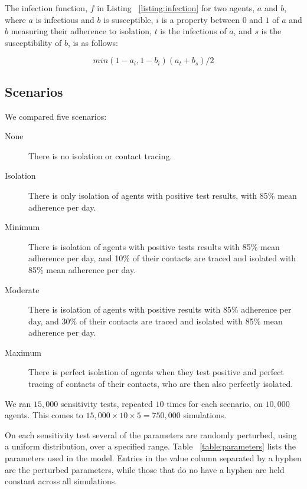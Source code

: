 \documentclass{article}
\begin{document}
The infection function, $f$ in Listing ~\ref{listing:infection} for two agents,
$a$ and $b$, where $a$ is infectious and $b$ is susceptible, $i$ is a property
between $0$ and $1$ of $a$ and $b$ measuring their adherence to isolation, $t$
is the infectious of $a$, and $s$ is the susceptibility of $b$, is
as follows:

\begin{equation}
min(1-a_i,1-b_i) (a_t+b_s)/2
\end{equation}

\subsection{Scenarios}

We compared five scenarios:

\begin{description}

\item[None] There is no isolation or contact tracing.

\item[Isolation] There is only isolation of agents with positive test results,
  with 85\% mean adherence per day.

\item[Minimum] There is isolation of agents with positive tests results with
  85\% mean adherence per day, and 10\% of their contacts are traced and
  isolated with 85\% mean adherence per day.

\item[Moderate] There is isolation of agents with positive results with 85\%
  adherence per day, and 30\% of their contacts are traced and isolated with
  85\% mean adherence per day.

\item[Maximum] There is perfect isolation of agents when they test positive and
  perfect tracing of contacts of their contacts, who are then also perfectly
  isolated.

\end{description}

We ran $15,000$ sensitivity tests, repeated $10$ times for each scenario, on
$10,000$ agents. This comes to $15,000 \times 10 \times 5 = 750,000$
simulations.

On each sensitivity test several of the parameters are randomly perturbed, using
a uniform distribution, over a specified range. Table ~\ref{table:parameters}
lists the parameters used in the model. Entries in the value column separated by
a hyphen are the perturbed parameters, while those that do no have a hyphen are
held constant across all simulations.
\end{document}
